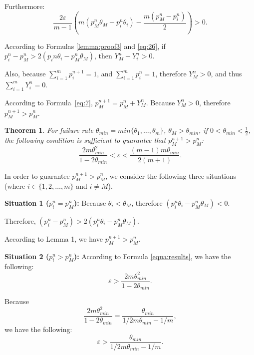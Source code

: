 \documentclass[10pt,journal,cspaper,compsoc,onecolumn]{IEEEtran}
\begin{document}
\begin{spacing}{1.3}
\begin{IEEEproof}
Furthermore:
\begin{equation}
  \label{lemma:proof3}
\displaystyle\frac{2\varepsilon}{m - 1}(m(p_M^{n}\theta_M - p_i^{n}\theta_i) - \displaystyle\frac{m(p_M^n - p_i^n)}{2}) > 0.
\end{equation}

According to Formulas \ref{lemma:proof3} and \ref{eq:26},
if $p_i^{n} - p_M^{n} > 2(p_i{n}\theta_i - p_M^{n}\theta_M)$, then
$Y_M^n - Y_i^n > 0$.

Also, because
$\sum_{i=1}^mp_i^{n + 1} = 1$, and
$\sum_{i=1}^mp_i^{n} = 1$, therefore
$Y_M^n >0$, and thus
$\sum_{i=1}^mY_i^n = 0$.

According to Formula~\ref{eq:7},
$p_M^{n + 1} = p_M^n + Y_M^n$.
Because $Y_M^n >0$, therefore
$p_M^{n + 1} > p_M^n$.
\end{IEEEproof}

\newtheorem{my}{Theorem}
\label{theorem}
\begin{my}
  For failure rate $\theta_{min} = min\{\theta_1, \ldots, \theta_m\}$, $\theta_M > \theta_{min}$, if $0 < \theta_{min} < \frac{1}{2}$, the following condition is sufficient to guarantee that $p_M^{n + 1} > p_M^{n}$:
  \begin{equation}
\label{equa:results}
  \displaystyle\frac{2m\theta_{min}^2}{1-2\theta_{min}} < \varepsilon < \displaystyle\frac{(m-1)m\theta_{min}}{2(m + 1)}.
\end{equation}
\end{my}

\begin{IEEEproof}
  In order to guarantee $p_M^{n + 1} > p_M^{n}$, we consider the following three situations (where $i \in \{1, 2, \ldots, m\}$ and $i \ne M$).

  \textbf{Situation 1 ($p_i^n = p_M^n$):}
Because $\theta_i < \theta_M$, therefore
$(p_i^n\theta_i - p_M^n\theta_M) < 0$.

Therefore, $(p_i^n - p_M^n) > 2(p_i^n\theta_i - p_M^n\theta_M)$.

According to Lemma 1, we have $p_M^{n + 1} > p_M^{n}$.

\textbf{Situation 2 ($p_i^n > p_M^n$):} According to Formula \ref{equa:results}, we have the following:
$$\varepsilon > \displaystyle\frac{2m\theta_{min}^2}{1-2\theta_{min}}.$$

Because
$$\displaystyle\frac{2m\theta_{min}^2}{1-2\theta_{min}} = \displaystyle\frac{\theta_{min}}{1/2m\theta_{min} - 1/m},$$
we have the following:
$$\varepsilon > \displaystyle\frac{\theta_{min}}{1/2m\theta_{min} - 1/m}.$$


\end{IEEEproof}
\end{spacing}
\end{document}
